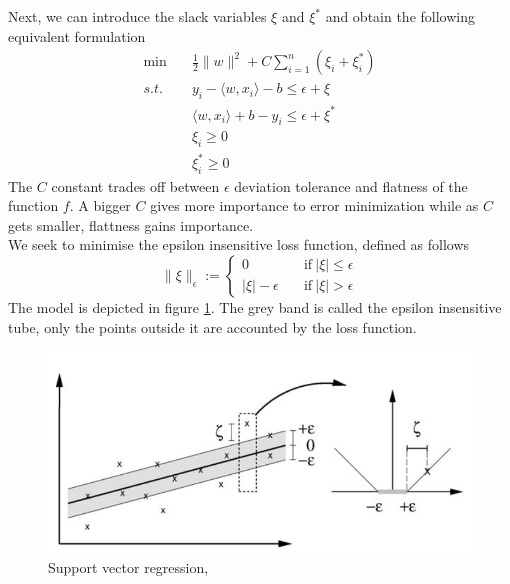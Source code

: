 Next, we can introduce the slack variables $\xi$ and $\xi^*$ and obtain the following equivalent formulation
\begin{equation}
    \begin{aligned}
        \min \quad& \frac{1}{2}\|w\|^2+C\sum\limits_{i=1}^n(\xi_i+\xi_i^*)
        \\
        s.t. \quad& y_i-\langle w, x_i\rangle-b\leq \epsilon+\xi
        \\
        \quad& \langle w, x_i\rangle +b-y_i\leq \epsilon+\xi^*
        \\
        \quad& \xi_i\geq0
        \\
        \quad& \xi_i^*\geq0
    \end{aligned}
\end{equation}
The $C$ constant trades off between $\epsilon$ deviation tolerance and flatness of the function $f$. A bigger $C$ gives more importance to error minimization while as $C$ gets smaller, flattness gains importance.
\\
We seek to minimise the epsilon insensitive loss function, defined as follows
\begin{equation}
    \|\xi\|_\epsilon:=\begin{cases}
        0 \quad& \textrm{if} \ |\xi|\leq \epsilon
        \\
        |\xi|-\epsilon \quad& \textrm{if} \ |\xi| > \epsilon
    \end{cases}
\end{equation}
The model is depicted in figure \ref{fig:svm_simple}. The grey band is called the epsilon insensitive tube, only the points outside it are accounted by the loss function.
\begin{figure}
    \includegraphics[width=\textwidth]{images/svm_simple.png}    
    \caption{Support vector regression,\cite{learning_with_kernels}}
    \label{fig:svm_simple}
\end{figure}
